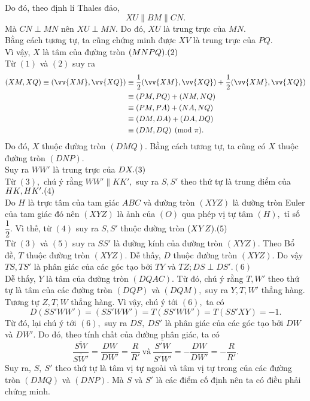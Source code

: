 \begin{bt}
{		Do đó, theo định lí Thales đảo, \[ XU \parallel BM \parallel CN.\]
		Mà $CN \perp MN$ nên $XU \perp MN.$ Do đó, $XU$ là trung trực của $MN.$\\
		Bằng cách tương tự, ta cũng chứng minh được $XV$ là trung trực của $PQ.$\\
		Vì vậy, $X$ là tâm của đường tròn $(MNPQ). \hfill (2)$\\
		Từ $(1)$ và $(2)$ suy ra
		{\allowdisplaybreaks
		\begin{align*}
		(XM,XQ) \equiv (\vv{XM},\vv{XQ})&\equiv \dfrac{1}{2}(\vv{XM},\vv{XQ})+\dfrac{1}{2}(\vv{XM},\vv{XQ})\\
		&\equiv (PM,PQ)+(NM,NQ)\\
		&\equiv (PM,PA)+(NA,NQ)\\
		&\equiv (DM,DA)+(DA,DQ)\\
		&\equiv	(DM,DQ) \pmod \pi.
		\end{align*}}Do đó, $X$ thuộc đường tròn $(DMQ) $.
		Bằng cách tương tự, ta cũng có $X$ thuộc đường tròn $(DNP).$\\
		Suy ra $WW'$ là trung trực của $DX. \hfill (3)$\\
		Từ $(3),$ chú ý rằng $WW' \parallel KK',$ suy ra $S,S'$ theo thứ tự là trung điểm của $HK,HK'. \hfill (4)$\\
		Do $H$ là trực tâm của tam giác $ABC$ và đường tròn $(XYZ)$ là đường tròn Euler của tam giác đó nên $(XYZ)$ là ảnh của $(O)$ qua phép vị tự tâm $(H),$ tỉ số $\dfrac{1}{2}.$ Vì thế, từ $(4)$ suy ra $S,S'$ thuộc đường tròn $(XYZ). \hfill (5)$\\
		Từ $(3)$ và $(5)$ suy ra $SS'$ là đường kính của đường tròn $(XYZ).$
		Theo Bổ đề, $T$ thuộc đường tròn $(XYZ).$
		Dễ thấy, $D$ thuộc đường tròn $(XYZ).$
		Do vậy $TS,TS'$ là phân giác của các góc tạo bởi $TY$ và $TZ;DS \perp DS'$.\hfill $(6)$\\
		Dễ thấy, $Y$ là tâm của đường tròn $(DQAC).$
		Từ đó, chú ý rằng $T,W'$ theo thứ tự là tâm của các đường tròn $(DQP)$ và $(DQM),$ suy ra $Y,T,W'$ thẳng hàng.
		Tương tự $Z,T,W$ thẳng hàng. 
		Vì vậy, chú ý tới $(6),$ ta có
		$$D(SS'WW')=(SS'WW')=T(SS'WW')=T(SS'XY)=-1.$$
		Từ đó, lại chú ý tới $(6),$ suy ra $DS,\ DS'$ là phân giác của các góc tạo bởi $DW$ và $DW'.$
		Do đó, theo tính chất của đường phân giác, ta có
		\[\dfrac{\overline{SW}}{\overline{SW'}}=\dfrac{DW}{DW'}=\dfrac{R}{R'}\ \text{và}\ \dfrac{\overline{S'W}}{\overline{S'W'}}=-\dfrac{DW}{DW'}=-\dfrac{R}{R'}. \] 
		Suy ra, $S,\ S'$ theo thứ tự là tâm vị tự ngoài và tâm vị tự trong của các đường tròn $(DMQ)$ và $(DNP).$
		Mà $S$ và $S'$ là các điểm cố định nên ta có điều phải chứng minh.\\
}
\end{bt}

